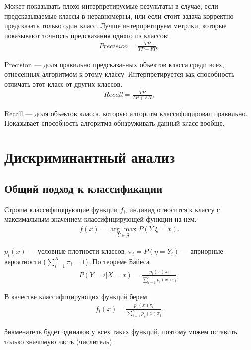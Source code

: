 \documentclass[12pt]{article}
\begin{document}
	Может показывать плохо интерпретируемые результаты в случае, если предсказываемые классы в неравномерны, или если стоит задача корректно предсказать только один класс. Лучше интерпретируем метрики, которые показывают точность предсказания одного из классов:
	\begin{eqnarray}\label{Precision}  
		Precision = \frac{TP}{TP+FP}, 
	\end{eqnarray}
	
	Precision --- доля правильно предсказанных объектов класса среди всех, отнесенных алгоритмом к этому классу. Интерпретируется как способность отличать этот класс от других классов.
	\begin{eqnarray}\label{Recall}  
		Recall = \frac{TP}{TP+FN}, 
	\end{eqnarray}
	
	Recall --- доля объектов класса, которую алгоритм классифицировал правильно. Показывает способность алгоритма обнаруживать данный класс вообще. 
	
	
	\section{Дискриминантный анализ}
	
	\subsection{Общий подход к классификации}
	
	Строим классифицирующие функции $f_i$, индивид относится к классу с максимальным значением классифицирующей функции на нем. 
	\begin{eqnarray}\label{classification_1}  
		f(x) = \underset{{Y \in \mathcal{G}}}{\arg \max}  P (Y \vert \xi = x). 
	\end{eqnarray}

	$p_i (x)$ --- условные плотности классов, $\pi_i = P(\eta = Y_i)$ --- априорные вероятности ($\sum_{i=1}^{K} {\pi_{i}} = 1$). По теореме Байеса
	\begin{eqnarray}\label{Bayes}  
		P (Y = i \vert X = x) = \frac {p_i(x) \pi_i}{\sum_{i=1}^{K} p_i (x) \pi_i}, 
	\end{eqnarray}
	
	В качестве классифицирующих функций берем
	\begin{eqnarray}\label{Discr_functions}  
		f_i (x) = \frac {p_i(x) \pi_i}{\sum_{j=1}^{K} p_j (x) \pi_j}. 
	\end{eqnarray}

	Знаменатель будет одинаков у всех таких функций, поэтому можем оставить только значимую часть (числитель).
	
\end{document}
